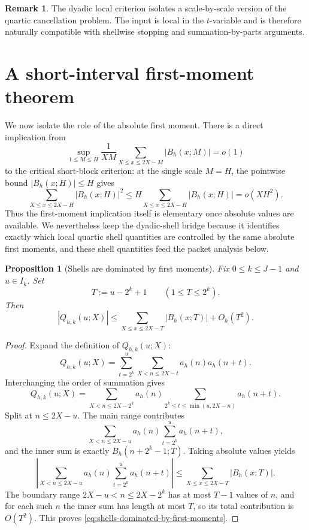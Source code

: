 \documentclass[11pt]{scrartcl}
\numberwithin{equation}{section}
\newtheorem{proposition}[theorem]{Proposition}
\theoremstyle{definition}
\newtheorem{remark}[theorem]{Remark}
\newcommand{\1}{\mathbf 1}
\newcommand{\abs}[1]{\left|#1\right|}
\begin{document}
\begin{remark}
The dyadic local criterion isolates a scale-by-scale version of the quartic cancellation problem. The input is local in the $t$-variable and is therefore naturally compatible with shellwise stopping and summation-by-parts arguments.
\end{remark}

\section{A short-interval first-moment theorem}
\label{sec:first-moment}

We now isolate the role of the absolute first moment. There is a direct implication from
\[
\sup_{1\le M\le H}
\frac{1}{XM}\sum_{X\le x\le 2X-M}\abs{B_h(x;M)}=o(1)
\]
to the critical short-block criterion: at the single scale $M=H$, the pointwise bound $\abs{B_h(x;H)}\le H$ gives
\[
\sum_{X\le x\le 2X-H}\abs{B_h(x;H)}^2
\le
H\sum_{X\le x\le 2X-H}\abs{B_h(x;H)}=o(XH^2).
\]
Thus the first-moment implication itself is elementary once absolute values are available. We nevertheless keep the dyadic-shell bridge because it identifies exactly which local quartic shell quantities are controlled by the same absolute first moments, and these shell quantities feed the packet analysis below.

\begin{proposition}[Shells are dominated by first moments]
\label{prop:shells-dominated-by-first-moments}
Fix $0\le k\le J-1$ and $u\in I_k$. Set
\[
T:=u-2^k+1
\qquad (1\le T\le 2^k).
\]
Then
\begin{equation}
\label{eq:shells-dominated-by-first-moments}
\abs{Q_{h,k}(u;X)}
\le
\sum_{X\le x\le 2X-T}\abs{B_h(x;T)}+O_h(T^2).
\end{equation}
\end{proposition}

\begin{proof}
Expand the definition of $Q_{h,k}(u;X)$:
\[
Q_{h,k}(u;X)=\sum_{t=2^k}^{u}\sum_{X<n\le 2X-t}a_h(n)a_h(n+t).
\]
Interchanging the order of summation gives
\[
Q_{h,k}(u;X)=\sum_{X<n\le 2X-2^k} a_h(n)\sum_{2^k\le t\le \min(u,2X-n)}a_h(n+t).
\]
Split at $n\le 2X-u$. The main range contributes
\[
\sum_{X<n\le 2X-u} a_h(n)\sum_{t=2^k}^{u}a_h(n+t),
\]
and the inner sum is exactly $B_h(n+2^k-1;T)$. Taking absolute values yields
\[
\abs{\sum_{X<n\le 2X-u} a_h(n)\sum_{t=2^k}^{u}a_h(n+t)}
\le
\sum_{X\le x\le 2X-T}\abs{B_h(x;T)}.
\]
The boundary range $2X-u<n\le 2X-2^k$ has at most $T-1$ values of $n$, and for each such $n$ the inner sum has length at most $T$, so its total contribution is $O(T^2)$. This proves \eqref{eq:shells-dominated-by-first-moments}.
\end{proof}
\end{document}

